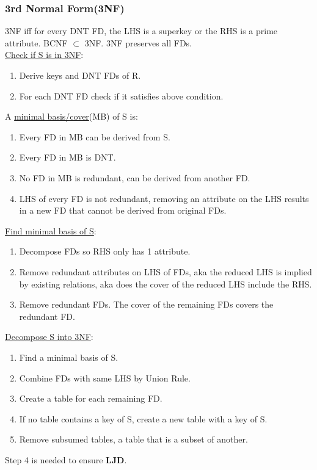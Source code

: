 \begin{multicols*}{3}
\subsubsection{3rd Normal Form(3NF)}
3NF iff for every DNT FD, the LHS is a superkey or the RHS is a prime attribute. BCNF $\subset$ 3NF. 3NF preserves all FDs.\\
\underline{Check if S is in 3NF}: 
\begin{enumerate}[leftmargin=*]
    \item Derive keys and DNT FDs of R.
    \item For each DNT FD check if it satisfies above condition.
\end{enumerate}
A \underline{minimal basis/cover}(MB) of S is:
\begin{enumerate}[leftmargin=*]
    \item Every FD in MB can be derived from S.
    \item Every FD in MB is DNT.
    \item No FD in MB is redundant, can be derived from another FD.
    \item LHS of every FD is not redundant, removing an attribute on the LHS results in a new FD that cannot be derived from original FDs.
\end{enumerate}
\underline{Find minimal basis of S}:
\begin{enumerate}[leftmargin=*]
    \item Decompose FDs so RHS only has 1 attribute.
    \item Remove redundant attributes on LHS of FDs, aka the reduced LHS is implied by existing relations, aka does the cover of the reduced LHS include the RHS.
    \item Remove redundant FDs. The cover of the remaining FDs covers the redundant FD.
\end{enumerate}
\underline{Decompose S into 3NF}:
\begin{enumerate}[leftmargin=*]
    \item Find a minimal basis of S.
    \item Combine FDs with same LHS by Union Rule. 
    \item Create a table for each remaining FD.
    \item If no table contains a key of S, create a new table with a key of S.
    \item Remove subsumed tables, a table that is a subset of another.
\end{enumerate}
Step 4 is needed to ensure \textbf{LJD}.

\end{multicols*}